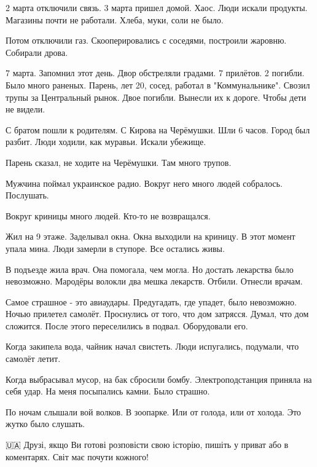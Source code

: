 2 марта отключили связь. 3 марта пришел домой. Хаос. Люди искали продукты.
Магазины почти не работали. Хлеба, муки, соли не было. 

Потом отключили газ. Скооперировались с соседями, построили жаровню. Собирали
дрова. 

7 марта. Запомнил этот день. Двор обстреляли градами. 7 прилётов. 2 погибли.
Было много раненых. Парень, лет 20, сосед, работал в "Коммунальнике". Свозил
трупы за Центральный рынок. Двое погибли. Вынесли их к дороге. Чтобы дети не
видели. 

С братом пошли к родителям. С Кирова на Черёмушки. Шли 6 часов. Город был
разбит. Люди ходили, как муравьи. Искали убежище. 

Парень сказал, не ходите на Черёмушки. Там много трупов. 

Мужчина поймал украинское радио. Вокруг него много людей собралось. Послушать. 

Вокруг криницы много людей. Кто-то не возвращался. 

Жил на 9 этаже. Заделывал окна. Окна выходили на криницу. В этот момент упала
мина. Люди замерли в ступоре. Все остались живы. 

В подъезде жила врач. Она помогала, чем могла. Но достать лекарства было
невозможно. Мародёры волокли два мешка лекарств. Отбили. Отнесли врачам. 

Самое страшное - это авиаудары. Предугадать, где упадет, было невозможно. Ночью
прилетел самолёт. Проснулись от того, что дом затрясся. Думал, что дом
сложится. После этого переселились в подвал. Оборудовали его. 

Когда закипела вода, чайник начал свистеть. Люди испугались, подумали, что
самолёт летит. 

Когда выбрасывал мусор, на бак сбросили бомбу. Электроподстанция приняла на
себя удар. На меня посыпались камни. Было страшно. 

По ночам слышали вой волков. В зоопарке. Или от голода, или от холода. Это
жутко было слушать.  

🇺🇦 Друзі, якщо Ви готові розповісти свою історію, пишіть у приват або в
коментарях. Світ має почути кожного! 
